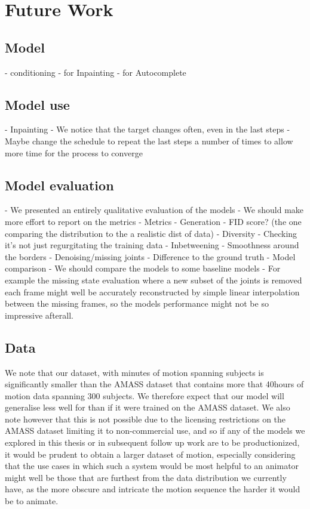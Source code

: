 \section{Future Work}
\label{sec:future_work}

\subsection{Model}
- conditioning
    - for Inpainting
    - for Autocomplete


\subsection{Model use}
- Inpainting
- We notice that the target changes often, even in the last steps
- Maybe change the schedule to repeat the last steps a number of times to allow more time for the process to converge


\subsection{Model evaluation}
- We presented an entirely qualitative evaluation of the models
    - We should make more effort to report on the metrics
    - Metrics
        - Generation
            - FID score? (the one comparing the distribution to the a realistic dist of data)
            - Diversity
            - Checking it's not just regurgitating the training data
        - Inbetweening
            - Smoothness around the borders
        - Denoising/missing joints
            - Difference to the ground truth
- Model comparison
    - We should compare the models to some baseline models
        - For example the missing state evaluation where a new subset of the joints is removed each frame might well be accurately reconstructed by simple linear interpolation between the missing frames, so the models performance might not be so impressive afterall.

            
\subsection{Data}
We note that our dataset, with  minutes of motion spanning  subjects is significantly smaller than the AMASS \cite{amass} dataset that contains more that 40hours of motion data spanning 300 subjects. We therefore expect that our model will generalise less well for than if it were trained on the AMASS dataset. We also note however that this is not possible due to the licensing restrictions on the AMASS dataset limiting it to non-commercial use, and so if any of the models we explored in this thesis or in subsequent follow up work are to be productionized, it would be prudent to obtain a larger dataset of motion, especially considering that the use cases in which such a system would be most helpful to an animator might well be those that are furthest from the data distribution we currently have, as the more obscure and intricate the motion sequence the harder it would be to animate.